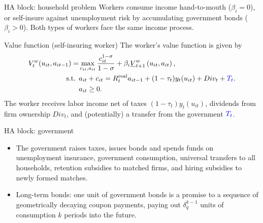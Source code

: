\documentclass[aspectratio=169]{beamer}
\begin{document}
\begin{frame}{HA block: household problem}
Workers consume income hand-to-mouth ($\beta_i=0$), or self-insure against unemployment risk by accumulating government bonds ($\beta_i>0$). Both types of workers face the same income process.
\bigskip
\begin{block}{Value function (self-insuring worker)}
The worker's value function is given by
\begin{align*}
	V_{t}^{w}(u_{it},a_{it-1})=&	\max_{c_{it},a_{it}}\frac{c_{it}^{1-\sigma}}{1-\sigma}+\beta_i\underline{V}_{t+1}^{w}\left(u_{it},a_{it}\right),\\
\text{{s.t.} }&	a_{it}+c_{it}=R_{t}^{\text{real}}a_{it-1}+(1-\tau_{t})y_{t}(u_{it})+Div_{t}+{\color{blue}T_t}.\\
	&a_{it}\geq0.
\end{align*}
The worker receives labor income net of taxes $(1-\tau_t)y_t(u_{it})$, dividends from firm ownership $Div_t$, and (potentially) a transfer from the government $\color{blue}T_t$.
\end{block}

\end{frame}

\begin{frame}{HA block: government}
\begin{itemize}
	\item The government raises taxes, issues bonds and spends funds on unemployment insurance, government consumption, universal transfers to all households, retention subsidies to matched firms, and hiring subsidies to newly formed matches.
	\item Long-term bonds: one unit of government bonds is a promise to a sequence of geometrically decaying coupon payments, paying out $\delta_{q}^{k-1}$ units of consumption $k$ periods into the future.
\end{itemize}

\end{frame}
\end{document}
